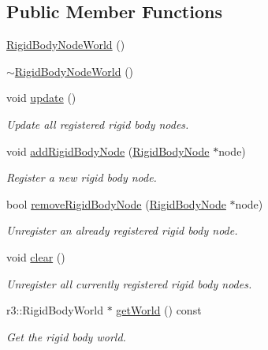 \subsection*{Public Member Functions}
\begin{DoxyCompactItemize}
\item 
\mbox{\hyperlink{class_rigid_body_node_world_a44345ab3fc624d3d100974f854468f68}{Rigid\+Body\+Node\+World}} ()
\item 
\mbox{\hyperlink{class_rigid_body_node_world_ac6a0800e44f827f97f3da6c68b53eabd}{$\sim$\+Rigid\+Body\+Node\+World}} ()
\item 
void \mbox{\hyperlink{class_rigid_body_node_world_a3b381c6da9b1374eb12117c6e8d0b57a}{update}} ()
\begin{DoxyCompactList}\small\item\em Update all registered rigid body nodes. \end{DoxyCompactList}\item 
void \mbox{\hyperlink{class_rigid_body_node_world_a1dc9da65de6b73fe78b08523eb7c6d5f}{add\+Rigid\+Body\+Node}} (\mbox{\hyperlink{class_rigid_body_node}{Rigid\+Body\+Node}} $\ast$node)
\begin{DoxyCompactList}\small\item\em Register a new rigid body node. \end{DoxyCompactList}\item 
bool \mbox{\hyperlink{class_rigid_body_node_world_a444034dce9139e77f7714779afb04235}{remove\+Rigid\+Body\+Node}} (\mbox{\hyperlink{class_rigid_body_node}{Rigid\+Body\+Node}} $\ast$node)
\begin{DoxyCompactList}\small\item\em Unregister an already registered rigid body node. \end{DoxyCompactList}\item 
void \mbox{\hyperlink{class_rigid_body_node_world_a3795fdb1b75c0da1286627e2c9b63830}{clear}} ()
\begin{DoxyCompactList}\small\item\em Unregister all currently registered rigid body nodes. \end{DoxyCompactList}\item 
r3\+::\+Rigid\+Body\+World $\ast$ \mbox{\hyperlink{class_rigid_body_node_world_aa1ddbb33d36e112134c54cbb5483df26}{get\+World}} () const
\begin{DoxyCompactList}\small\item\em Get the rigid body world. \end{DoxyCompactList}\end{DoxyCompactItemize}


